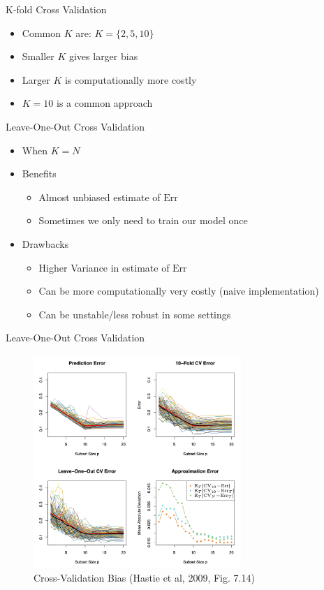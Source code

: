 \documentclass[10pt,handout]{beamer}
\begin{document}
\begin{frame}{K-fold Cross Validation}

\begin{itemize}
\item Common $K$ are: $K=\{2,5,10\}$
\item Smaller $K$ gives larger bias
\item Larger $K$ is computationally more costly
\item $K=10$ is a common approach
\end{itemize}

\end{frame}


\begin{frame}{Leave-One-Out Cross Validation}

\begin{itemize}
\item When $K=N$
\item Benefits
\begin{itemize}
\item Almost unbiased estimate of $\text{Err}$
\item Sometimes we only need to train our model once
\end{itemize}
\item Drawbacks
\begin{itemize}
\item Higher Variance in estimate of $\text{Err}$
\item Can be more computationally very costly (naive implementation)
\item Can be unstable/less robust in some settings
\end{itemize}
\end{itemize}

\end{frame}


\begin{frame}{Leave-One-Out Cross Validation}

\begin{figure}[h]
\caption{Cross-Validation Bias (Hastie et al, 2009, Fig. 7.14)}
\centering
\includegraphics[width=0.7\textwidth]{figs/ESL_7_14.png}
\end{figure}

\end{frame}
\end{document}
